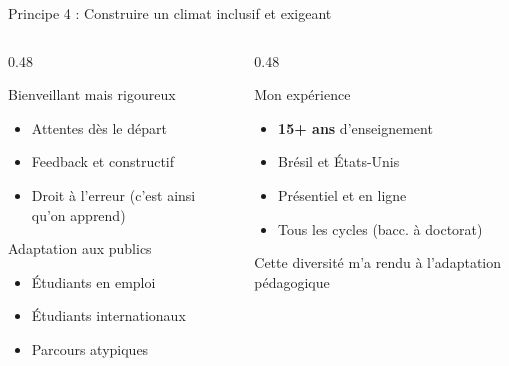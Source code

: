 \documentclass[aspectratio=169,11pt]{beamer}
\begin{document}
\begin{frame}{Principe 4 : Construire un climat inclusif et exigeant}
  \begin{columns}[T]
    \begin{column}{0.48\textwidth}
      \begin{block}{Bienveillant mais rigoureux}
        \begin{itemize}
          \item Attentes  dès le départ
          \item Feedback  et constructif
          \item Droit à l'erreur (c'est ainsi qu'on apprend)
        \end{itemize}
      \end{block}
      
      \vspace{0.3em}
      
      \begin{exampleblock}{Adaptation aux publics}
        \small
        \begin{itemize}
          \item Étudiants en emploi
          \item Étudiants internationaux
          \item Parcours atypiques
        \end{itemize}
      \end{exampleblock}
    \end{column}
    \begin{column}{0.48\textwidth}
      \begin{alertblock}{Mon expérience}
        \begin{itemize}
          \item \textbf{15+ ans} d'enseignement
          \item Brésil et États-Unis
          \item Présentiel et en ligne
          \item Tous les cycles (bacc. à doctorat)
        \end{itemize}
      \end{alertblock}
      
      \vspace{0.3em}
      
      {\small Cette diversité m'a rendu  à l'adaptation pédagogique}
    \end{column}
  \end{columns}
\end{frame}
\end{document}

